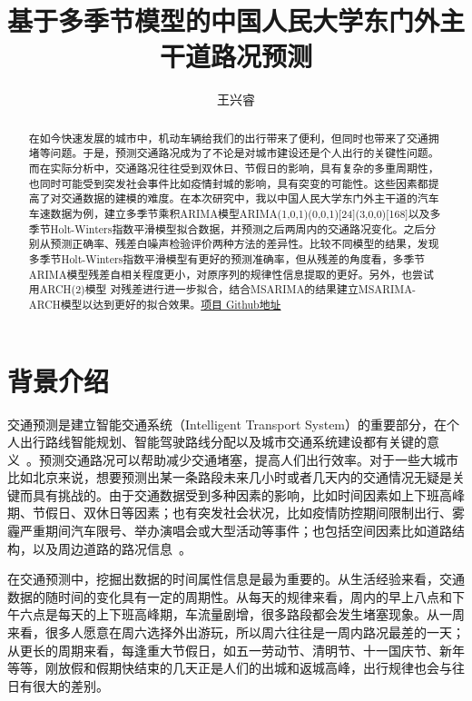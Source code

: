 \documentclass[lang=cn,11pt,a4paper]{elegantpaper}
\title{基于多季节模型的中国人民大学东门外主干道路况预测}
\author{王兴睿}
\institute{中国人民大学 统计学院17级一班}
\date{\zhtoday}
\begin{document}
\maketitle

\begin{abstract}
在如今快速发展的城市中，机动车辆给我们的出行带来了便利，但同时也带来了交通拥堵等问题。于是，预测交通路况成为了不论是对城市建设还是个人出行的关键性问题。而在实际分析中，交通路况往往受到双休日、节假日的影响，具有复杂的多重周期性，也同时可能受到突发社会事件比如疫情封城的影响，具有突变的可能性。这些因素都提高了对交通数据的建模的难度。在本次研究中，我以中国人民大学东门外主干道的汽车车速数据为例，建立多季节乘积ARIMA模型ARIMA(1,0,1)(0,0,1)[24](3,0,0)[168]以及多季节Holt-Winters指数平滑模型拟合数据，并预测之后两周内的交通路况变化。之后分别从预测正确率、残差白噪声检验评价两种方法的差异性。比较不同模型的结果，发现多季节Holt-Winters指数平滑模型有更好的预测准确率，但从残差的角度看，多季节ARIMA模型残差自相关程度更小，对原序列的规律性信息提取的更好。另外，也尝试用ARCH(2)模型
对残差进行进一步拟合，结合MSARIMA的结果建立MSARIMA-ARCH模型以达到更好的拟合效果。\href{https://github.com/XingruiWang/ruc_traffic_prediction}{项目
Github地址}
\end{abstract}

\section{背景介绍}
交通预测是建立智能交通系统（Intelligent Transport System）的重要部分，在个人出行路线智能规划、智能驾驶路线分配以及城市交通系统建设都有关键的意义~\cite{its}。预测交通路况可以帮助减少交通堵塞，提高人们出行效率。对于一些大城市比如北京来说，想要预测出某一条路段未来几小时或者几天内的交通情况无疑是关键而具有挑战的。由于交通数据受到多种因素的影响，比如时间因素如上下班高峰期、节假日、双休日等因素；也有突发社会状况，比如疫情防控期间限制出行、雾霾严重期间汽车限号、举办演唱会或大型活动等事件；也包括空间因素比如道路结构，以及周边道路的路况信息~\cite{bbliaojqZhangKDD18deep}。

在交通预测中，挖掘出数据的时间属性信息是最为重要的。从生活经验来看，交通数据的随时间的变化具有一定的周期性。从每天的规律来看，周内的早上八点和下午六点是每天的上下班高峰期，车流量剧增，很多路段都会发生堵塞现象。从一周来看，很多人愿意在周六选择外出游玩，所以周六往往是一周内路况最差的一天；从更长的周期来看，每逢重大节假日，如五一劳动节、清明节、十一国庆节、新年等等，刚放假和假期快结束的几天正是人们的出城和返城高峰，出行规律也会与往日有很大的差别。
\end{document}
